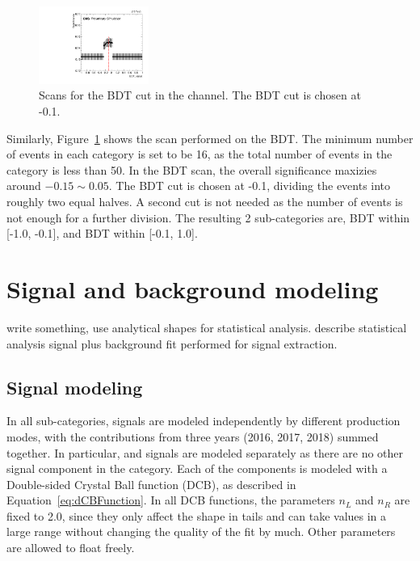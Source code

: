 \begin{figure}[!htb]
  \centering
  \captionsetup{justification=centering}
  \includegraphics[width=0.32\textwidth]{pics/VH_sec/VH_BDT_cats/ZH_BDT_scan.pdf}
  \caption{Scans for the BDT cut in the \ZH channel. The BDT cut is chosen at -0.1.}
  \label{fig:zh_bdt_cat_scan}
\end{figure}

Similarly, Figure~\ref{fig:zh_bdt_cat_scan} shows the scan performed on the \ZH BDT. 
The minimum number of events in each category is set to be 16, 
as the total number of events in the \ZH category is less than 50. 
In the BDT scan, the overall significance maxizies around $-0.15 \sim 0.05$.
The BDT cut is chosen at -0.1, dividing the \ZH events into roughly two equal halves.
A second cut is not needed as the number of events is not enough for a further division.
The resulting 2 \ZH sub-categories are, BDT within [-1.0, -0.1], and BDT within [-0.1, 1.0].



\section{Signal and background modeling}\label{sec:vh_sig_bkg_model}

write something, use analytical shapes for statistical analysis.
describe statistical analysis
signal plus background fit performed for signal extraction.

\subsection{Signal modeling}\label{sec:vh_sig_model}
In all sub-categories, signals are modeled independently by different production modes,
with the contributions from three years (2016, 2017, 2018) summed together. 
In particular, \qqZH and \ggZH signals are modeled separately as there are no other signal component in the \ZH category.
Each of the components is modeled with a Double-sided Crystal Ball function (DCB), as described in Equation~\ref{eq:dCBFunction}.  
In all DCB functions, the parameters $n_L$ and $n_R$ are fixed to 2.0, 
since they only affect the shape in tails and can take values in a large range without changing the quality of the fit by much. 
Other parameters are allowed to float freely.  

